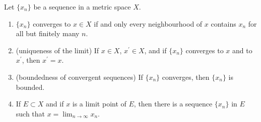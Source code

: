 \begin{proposition}
Let $\{x_n\}$ be a sequence in a metric space $X$.
\begin{enumerate}[label=(\arabic*)]
\item $\{x_n\}$ converges to $x\in X$ if and only every neighbourhood of $x$ contains $x_n$ for all but finitely many $n$.
\item (uniqueness of the limit) If $x\in X$, $x^\prime\in X$, and if $\{x_n\}$ converges to $x$ and to $x^\prime$, then $x^\prime=x$.
\item (boundedness of convergent sequences) If $\{x_n\}$ converges, then $\{x_n\}$ is bounded.
\item If $E\subset X$ and if $x$ is a limit point of $E$, then there is a sequence $\{x_n\}$ in $E$ such that $\displaystyle x=\lim_{n\to\infty}x_n$.
\end{enumerate}
\end{proposition}

